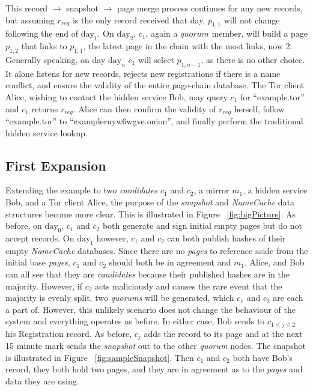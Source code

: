 This record $ \to $ snapshot $ \to $ page merge process continues for any new records, but assuming $ r_{reg} $ is the only record received that day, $ p_{1,1} $ will not change following the end of $ \textrm{day}_{1} $. On $ \textrm{day}_{2} $, $ c_{1} $, again a $ quorum $ member, will build a page $ p_{1,2} $ that links to $ p_{1,1} $, the latest page in the chain with the most links, now 2. Generally speaking, on day $ \textrm{day}_{n} $ $ c_{1} $ will select $ p_{1,n-1} $, as there is no other choice. It alone listens for new records, rejects new registrations if there is a name conflict, and ensure the validity of the entire page-chain database. The Tor client Alice, wishing to contact the hidden service Bob, may query $ c_{1} $ for ``example.tor'' and $ c_{1} $ returns $ r_{reg} $. Alice can then confirm the validity of $ r_{reg} $ herself, follow ``example.tor'' to ``exampleruyw6wgve.onion'', and finally perform the traditional hidden service lookup.

\subsection{First Expansion}


Extending the example to two \emph{candidates} $ c_{1} $ and $ c_{2} $, a mirror $ m_{1} $, a hidden service Bob, and a Tor client Alice, the purpose of the \emph{snapshot} and \emph{NameCache} data structures become more clear. This is illustrated in Figure ~\ref{fig:bigPicture}. As before, on $ \textrm{day}_{0} $, $ c_{1} $ and $ c_{2} $ both generate and sign initial empty pages but do not accept records. On $ \textrm{day}_{1} $ however, $ c_{1} $ and $ c_{2} $ can both publish hashes of their empty \emph{NameCache} databases. Since there are no \emph{pages} to reference aside from the initial base \emph{pages}, $ c_{1} $ and $ c_{2} $ should both be in agreement and $ m_{1} $, Alice, and Bob can all see that they are \emph{candidates} because their published hashes are in the majority. However, if $ c_{2} $ acts maliciously and causes the rare event that the majority is evenly split, two \emph{quorums} will be generated, which $ c_{1} $ and $ c_{2} $ are each a part of. However, this unlikely scenario does not change the behaviour of the system and everything operates as before. In either case, Bob sends to $ c_{1 \le j \le 2} $ his Registration record. As before, $ c_{j} $ adds the record to its page and at the next 15 minute mark sends the \emph{snapshot} out to the other \emph{quorum} nodes. The snapshot is illustrated in Figure ~\ref{fig:sampleSnapshot}. Then $ c_{1} $ and $ c_{2} $ both have Bob's record, they both hold two pages, and they are in agreement as to the \emph{pages} and data they are using.

